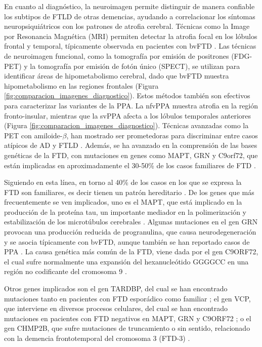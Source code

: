 En cuanto al diagnóstico, la neuroimagen permite distinguir de manera confiable los subtipos de FTLD de otras demencias, ayudando a correlacionar los síntomas neuropsiquiátricos con los patrones de atrofia cerebral. Técnicas como la Image por Resonancia Magnética (MRI) permiten detectar la atrofia focal en los lóbulos frontal y temporal, típicamente observada en pacientes con bvFTD \cite{gorno2011classification}. Las técnicas de neuroimagen funcional, como la tomografía por emisión de positrones (FDG-PET) y la tomografía por emisión de fotón único (SPECT), se utilizan para identificar áreas de hipometabolismo cerebral, dado que bvFTD muestra hipometabolismo en las regiones frontales \cite{varma2002spect, kanda2008fdgpet} (Figura \ref{fig:comparacion_imagenes_diagnostico}). Estos métodos también son efectivos para caracterizar las variantes de la PPA. La nfvPPA muestra atrofia en la región fronto-insular, mientras que la svPPA afecta a los lóbulos temporales anteriores \cite{gorno2011classification} (Figura \ref{fig:comparacion_imagenes_diagnostico}). Técnicas avanzadas como la PET con amiloide-\(\beta\), han mostrado ser prometedoras para discriminar entre casos atípicos de AD y FTLD \cite{rowe2007imagingamiloid}. Además, se ha avanzado en la comprensión de las bases genéticas de la FTD, con mutaciones en genes como MAPT, GRN y C9orf72, que están implicadas en aproximadamente el 30-50\% de los casos familiares de FTD \cite{sirkis2019recentgenes}.


Siguiendo en esta línea, en torno al 40\% de los casos en los que se expresa la FTD son familiares, es decir tienen un patrón hereditario \cite{pan2013clinic, sirkis2019recentgenes}. De los genes que más frecuentemente se ven implicados, uno es el MAPT, que está implicado en la producción de la proteína tau, un importante mediador en la polimerización y estabilización de los microtúbulos cerebrales \cite{caillet2015regulation}. Algunas mutaciones en el gen GRN provocan una producción reducida de progranulina, que causa neurodegeneración y se asocia típicamente con bvFTD, aunque también se han reportado casos de PPA \cite{bateman2009granulin}. La causa genética más común de la FTD, viene dada por el gen C9ORF72, el cual sufre normalmente una expansión del hexanucleótido GGGGCC en una región no codificante del cromosoma 9 \cite{mackenzie2014neuropathology}.

Otros genes implicados son el gen TARDBP, del cual se han encontrado mutaciones tanto en pacientes con FTD esporádico como familiar \cite{borroni2010tardbp}; el gen VCP, que interviene en diversos procesos celulares, del cual se han encontrado mutaciones en pacientes con FTD negativos en MAPT, GRN y C9ORF72 \cite{wong2018three}; o el gen CHMP2B, que sufre mutaciones de truncamiento o sin sentido, relacionado con la demencia frontotemporal del cromosoma 3 (FTD-3) \cite{m2011frontotemporal}.

